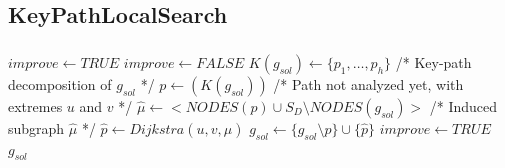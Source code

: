 \subsection{KeyPathLocalSearch}
\begin{frame}\frametitle{}
\begin{block}{}
\begin{algorithm}[H]
\caption{$g_{sol} = KeyPathLocalSearch(G_B,C,g_{sol})$}
\begin{algorithmic}[1]
\begin{tiny}
\STATE $improve \leftarrow TRUE$
\STATE $improve \leftarrow FALSE$
\STATE $K(g_{sol}) \leftarrow \{p_1,\ldots,p_h\}$ /* Key-path decomposition of $g_{sol}$ */
\STATE $p \leftarrow(K(g_{sol}))$ /* Path not analyzed yet, with extremes $u$ and $v$ */
\STATE $\hat{\mu} \leftarrow <NODES(p) \cup S_D\setminus NODES(g_{sol}) > $ /* Induced subgraph $\hat{\mu}$ */
\STATE $\hat{p} \leftarrow Dijkstra(u,v,\hat{\mu})$
\STATE $g_{sol} \leftarrow \{ g_{sol}\setminus p \} \cup \{\hat{p}\}$
\STATE $improve \leftarrow TRUE$
\ENDIF
\ENDWHILE
\ENDWHILE
\RETURN $g_{sol}$
\end{tiny}
\end{algorithmic}
\end{algorithm}
\end{block}
\end{frame}

